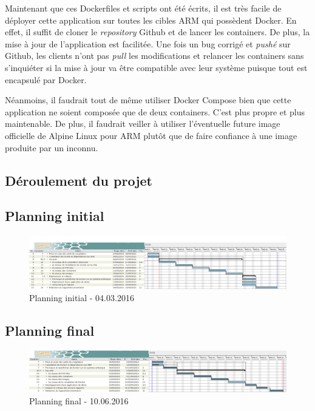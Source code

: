 \documentclass[11pt,a4paper,oneside]{report}
\begin{document}
Maintenant que ces Dockerfiles et scripts ont été écrits, il est très facile de déployer cette application sur toutes les cibles ARM qui possèdent Docker. En effet, il suffit de cloner le \textit{repository} Github et de lancer les containers. De plus, la mise à jour de l'application est facilitée. Une fois un bug corrigé et \textit{pushé} sur Github, les clients n'ont pas \textit{pull} les modifications et relancer les containers sans s'inquiéter si la mise à jour va être compatible avec leur système puisque tout est encapsulé par Docker.

Néanmoins, il faudrait tout de même utiliser Docker Compose bien que cette application ne soient composée que de deux containers. C'est plus propre et plus maintenable. De plus, il faudrait veiller à utiliser l'éventuelle future image officielle de Alpine Linux pour ARM plutôt que de faire confiance à une image produite par un inconnu. 

\begin{landscape}
\chapter{Déroulement du projet}


\section{Planning initial}
\begin{figure}[ht]
\centering
\includegraphics[width=24cm]{img/initial_planning.png}
\caption{Planning initial - 04.03.2016}
\end{figure}


\section{Planning final}
\begin{figure}[ht]
\centering
\includegraphics[width=24cm]{img/final_planning.png}
\caption{Planning final - 10.06.2016}
\end{figure}

\end{landscape}
\end{document}
